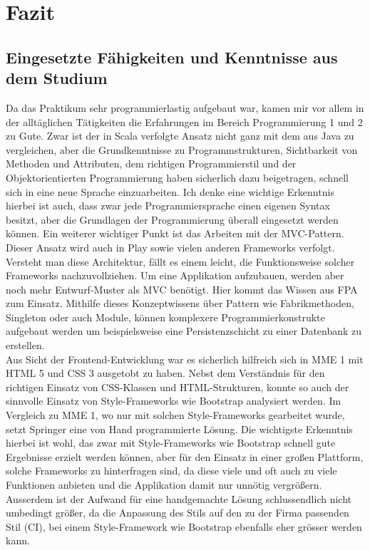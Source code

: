 %
\chapter{Fazit}
\label{sec:Fazit}

\section{Eingesetzte Fähigkeiten und Kenntnisse aus dem Studium}
\label{sec:Fazit:SP}

Da das Praktikum sehr programmierlastig aufgebaut war, kamen mir vor allem in der alltäglichen Tätigkeiten die Erfahrungen im Bereich Programmierung 1 und 2 zu Gute. Zwar ist der in Scala verfolgte Ansatz nicht ganz mit dem aus Java zu vergleichen, aber die Grundkenntnisse zu Programmstrukturen, Sichtbarkeit von Methoden und Attributen, dem richtigen Programmierstil und der Objektorientierten Programmierung haben sicherlich dazu beigetragen, schnell sich in eine neue Sprache einzuarbeiten. Ich denke eine wichtige Erkenntnis hierbei ist auch, dass zwar jede Programmiersprache einen eigenen Syntax besitzt, aber die Grundlagen der Programmierung überall eingesetzt werden können. Ein weiterer wichtiger Punkt ist das Arbeiten mit der MVC-Pattern. Dieser Ansatz wird auch in Play sowie vielen anderen Frameworks verfolgt. Versteht man diese Architektur, fällt es einem leicht, die Funktionsweise solcher Frameworks nachzuvollziehen. Um eine Applikation aufzubauen, werden aber noch mehr Entwurf-Muster als MVC benötigt. Hier kommt das Wissen aus FPA zum Einsatz. Mithilfe dieses Konzeptwissens über Pattern wie Fabrikmethoden, Singleton oder auch Module, können komplexere Programmierkonstrukte aufgebaut werden um beispielsweise eine Persistenzschicht zu einer Datenbank zu erstellen. 
\\
\newline
Aus Sicht der Frontend-Entwicklung war es sicherlich hilfreich sich in MME 1 mit HTML 5 und CSS 3 ausgetobt zu haben. Nebst dem Verständnis für den richtigen Einsatz von CSS-Klassen und HTML-Strukturen, konnte so auch der sinnvolle Einsatz von Style-Frameworks wie Bootstrap analysiert werden. Im Vergleich zu MME 1, wo nur mit solchen Style-Frameworks gearbeitet wurde, setzt Springer eine von Hand programmierte Lösung. Die wichtigste Erkenntnis hierbei ist wohl, das zwar mit Style-Frameworks wie Bootstrap schnell gute Ergebnisse erzielt werden können, aber für den Einsatz in einer großen Plattform, solche Frameworks zu hinterfragen sind, da diese viele und oft auch zu viele Funktionen anbieten und die Applikation damit nur unnötig vergrößern. Ausserdem ist der Aufwand für eine handgemachte Lösung schlussendlich nicht umbedingt größer, da die Anpassung des Stils auf den zu der Firma passenden Stil (CI), bei einem Style-Framework wie Bootstrap ebenfalls eher grösser werden kann.
